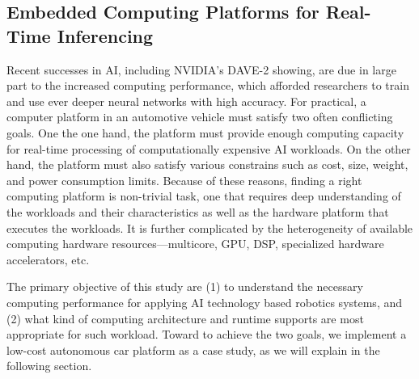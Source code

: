 



\subsection{Embedded Computing Platforms for Real-Time Inferencing}

Recent successes in AI, including NVIDIA's DAVE-2 showing, are due
in large part to the increased computing performance,
which afforded researchers to train and use ever deeper neural networks with
high accuracy. For practical, a computer platform in an automotive vehicle must
satisfy two often conflicting goals. One the one hand, the platform must provide
enough computing capacity for real-time processing of computationally expensive
AI workloads. On the other hand, the platform must also satisfy various
constrains such as cost, size, weight, and power consumption limits.
Because of these reasons, finding a right computing platform is non-trivial
task, one that requires deep understanding of the workloads and their
characteristics as well as the hardware platform that executes the
workloads. It is further complicated by the heterogeneity of available
computing hardware resources---multicore, GPU, DSP, specialized
hardware accelerators, etc.

The primary objective of this study are (1) to understand the necessary
computing performance for applying AI technology based robotics systems, and
(2) what kind of computing architecture and runtime supports
are most appropriate for such workload.
Toward to achieve the two goals, we implement a low-cost autonomous
car platform as a case study, as we will explain in the following
section.
